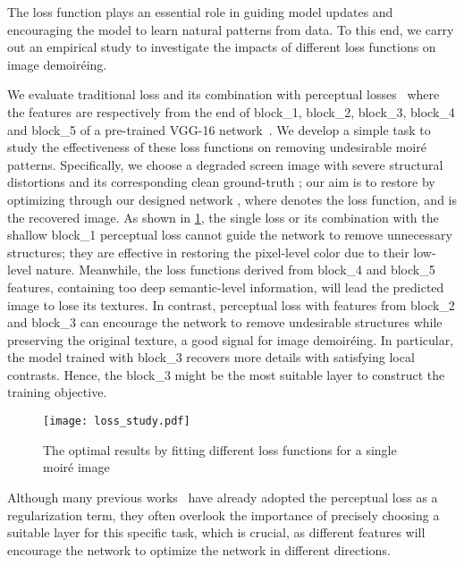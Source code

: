 \documentclass[runningheads]{llncs}
\begin{document}
The loss function plays an essential role in guiding model updates and encouraging the model to learn natural patterns from data. To this end, we carry out an empirical study to investigate the impacts of different loss functions on image demoiréing. 

We evaluate traditional  loss and its combination with perceptual losses~\cite{johnson2016perceptual} where the features are respectively from the end of block\_1, block\_2, block\_3, block\_4 and block\_5 of a pre-trained VGG-16 network~\cite{simonyan2014very}.
We develop a simple task to study the effectiveness of these loss functions on removing undesirable moiré patterns. 
Specifically, we choose a degraded screen image  with severe structural distortions and its corresponding clean ground-truth ; our aim is to restore  by  optimizing  through our designed network , where  denotes the loss function, and  is the recovered image.
As shown in \cref{fig:loss study}, the single  loss or its combination with the shallow block\_1 perceptual loss cannot guide the network to remove unnecessary structures; they are effective in restoring the pixel-level color due to their low-level nature. 
Meanwhile, the loss functions derived from block\_4 and block\_5 features, containing too deep semantic-level information, will lead the predicted image to lose its textures. 
In contrast, perceptual loss with features from  block\_2 and block\_3 can encourage the network to remove undesirable structures while preserving the original texture, a good signal for image demoiréing.  
In particular, the model trained with  block\_3 recovers more details with satisfying local contrasts. Hence, the block\_3 might be the most suitable layer to construct the training objective.   

\begin{figure}
   \begin{center}
      \texttt{[image: loss\_study.pdf]}
   \end{center}
      
      \caption{The optimal results by fitting different loss functions for a single moiré image}
      
   \label{fig:loss study}
\end{figure}

Although many previous works~\cite{he2019mop,he2020fhde,liu2020wavelet} have already adopted the perceptual loss as a regularization term, they often overlook the importance of precisely choosing a suitable layer for this specific task, which is crucial, as different features will encourage the network to optimize the network in different directions.
\end{document}
